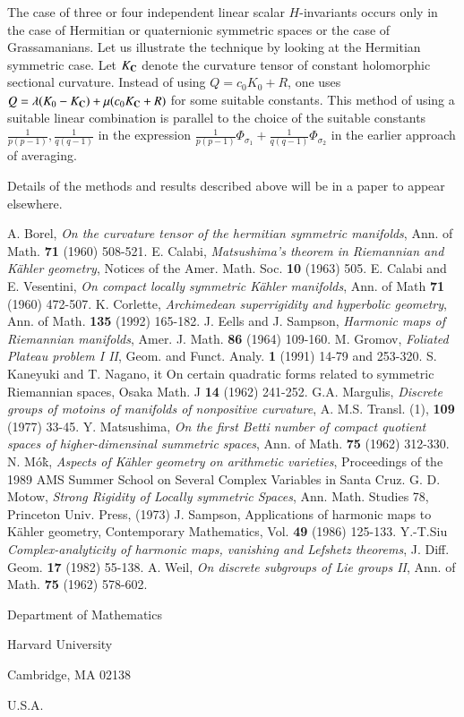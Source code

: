 The case of three or four independent linear scalar $H$-invariants occurs only in the case of Hermitian or quaternionic symmetric spaces or the case of Grassamanians. Let us illustrate the technique by looking at the Hermitian symmetric case. Let $K_{\mathbf{C}}$ denote the curvature tensor of constant holomorphic sectional curvature. Instead of using $Q=c_{0}K_{0} + R$, one uses $Q=\lambda(K_{0}-K_{\mathbf{C}}) + \mu (c_{0}K_{\mathbf{C}} + R)$ for some suitable constants. This method of using a suitable linear combination is parallel to the choice of the suitable constants $\frac{1}{p(p-1)}, \frac{1}{q(q-1)}$ in the expression $\frac{1}{p(p-1)}\Phi_{\sigma_{1}} + \frac{1}{q(q-1)}\Phi_{\sigma_{2}}$ in the earlier approach of averaging.

Details of the methods and results described above will be in a paper to appear elsewhere.

\begin{thebibliography}{99}
 A. Borel, \textit{On the curvature tensor of the hermitian symmetric manifolds}, Ann. of Math.
{\bf 71} (1960) 508-521. 
 E. Calabi, \textit{Matsushima's theorem in Riemannian and K\"ahler geometry}, Notices of the Amer. Math. Soc. {\bf 10} (1963) 505.
 E. Calabi and E. Vesentini, \textit{On compact locally symmetric K\"ahler manifolds}, Ann. of Math {\bf 71} (1960) 472-507.
 K. Corlette, \textit{Archimedean superrigidity and hyperbolic geometry}, Ann. of Math. {\bf 135} (1992) 165-182.
 J. Eells and J. Sampson, \textit{Harmonic maps of Riemannian manifolds}, Amer. J. Math. {\bf 86} (1964) 109-160.
M. Gromov, \textit{Foliated Plateau problem I II}, Geom. and Funct. Analy. {\bf 1} (1991) 14-79 and 253-320.
 S. Kaneyuki and T. Nagano, it On certain quadratic forms related to symmetric Riemannian spaces, Osaka Math. J {\bf 14} (1962) 241-252.
G.A. Margulis, \textit{Discrete groups of motoins of manifolds of nonpositive curvature}, A. M.S. Transl. (1), {\bf 109} (1977) 33-45.
 Y. Matsushima, \textit{On the first Betti number of compact quotient spaces of higher-dimensinal summetric spaces}, Ann. of Math. {\bf 75} (1962) 312-330.
N. M\'o\`k, \textit{Aspects of K\"ahler geometry on arithmetic varieties}, Proceedings of the 1989 AMS Summer School on Several Complex Variables in Santa Cruz.
 G. D. Motow, \textit{Strong Rigidity of Locally symmetric Spaces}, Ann. Math. Studies 78, Princeton Univ. Press, (1973)
 J. Sampson, Applications of harmonic maps to K\"ahler geometry, Contemporary Mathematics,
Vol. {\bf 49} (1986) 125-133.
Y.-T.Siu \textit{Complex-analyticity of harmonic maps, vanishing and Lefshetz theorems}, J. Diff. Geom. {\bf 17} (1982) 55-138.
A. Weil, \textit{On discrete subgroups of Lie groups II}, Ann. of Math. {\bf 75} (1962) 578-602.
\end{thebibliography}

\begin{flushleft}
Department of Mathematics

Harvard University

Cambridge, MA 02138

U.S.A.
\end{flushleft}
